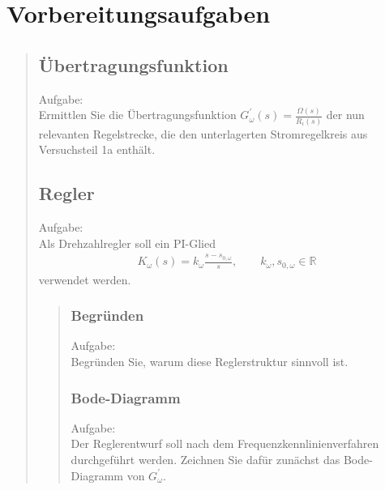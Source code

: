 \section{Vorbereitungsaufgaben}
\begin{quote}
	\subsection{Übertragungsfunktion}
    Aufgabe:\\
    Ermittlen Sie die Übertragungsfunktion $G_\omega^{'} (s) = \frac{\Omega(s)}{R_i (s)}$ der nun relevanten
    Regelstrecke, die den unterlagerten Stromregelkreis aus Versuchsteil 1a enthält.\\
	\begin{quote}
		
		
        
	\end{quote}
	
	\subsection{Regler}
    Aufgabe:\\
    Als Drehzahlregler soll ein PI-Glied\\
    \begin{equation*}
        \begin{split}
            K_\omega (s) = k_\omega \frac{s-s_{0,\omega}}{s}, \hspace{2em} k_\omega, s_{0,\omega} \in \mathbb{R}
        \end{split}
    \end{equation*}
    verwendet werden.
	\begin{quote}
		
		\subsubsection{Begründen}
        Aufgabe:\\
        Begründen Sie, warum diese Reglerstruktur sinnvoll ist.\\
		\begin{quote}
			
		\end{quote}
		
		\subsubsection{Bode-Diagramm}
        Aufgabe:\\
        Der Reglerentwurf soll nach dem Frequenzkennlinienverfahren durchgeführt werden. Zeichnen Sie dafür zunächst
        das Bode-Diagramm von $G_\omega^{'}$.\\   
        \begin{quote}
                        

\end{quote}
\end{quote}
\end{quote}
